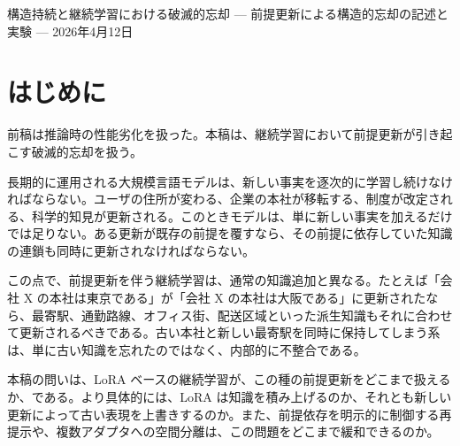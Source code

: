 \documentclass[12pt,a4paper]{article}
\begin{document}
\PaperTitleBlock
  {構造持続と継続学習における破滅的忘却}
  {— 前提更新による構造的忘却の記述と実験 —}
  {2026年4月12日}

\begin{abstract}
大規模言語モデルに新しい知識を逐次的に学習させると、古い知識が壊れることがある。しかし、すべての忘却が同じではない。ある前提が変わったとき、その前提に依存していた知識の連鎖がまとめて崩れる場合がある。本稿ではこれを構造的忘却と呼び、単一の事実の喪失と区別する。

7モデル（1.5B〜72B、4系統）で LoRA による逐次学習を行い、三つの条件を比較した。第一は過去の事実を再提示する基準条件（E-lite）、第二は前提の依存構造を追跡して選択的に再提示する条件（F-v2c）、第三は現在知識と過去知識を別々のアダプタに分離する条件（F-multi）である。全モデル・全条件で、最初の前提更新以降に旧知識の保持が急減した。LoRA は知識を積み上げるというより、上書きに近く振る舞う。前提依存を追跡して選択的に再提示すると依存整合性は改善するが、旧知識の保持忠実度は低いままである。多アダプタ分離は非ゼロの旧知識保持を与えるが、高忠実度の長期保持にはなお届かない。少なくとも本実験条件では、LoRA によるパラメータ更新だけでは依存知識の整合した再編を十分に担えないことが示される。
\end{abstract}

\section{はじめに}\label{ux306fux3058ux3081ux306b}

前稿は推論時の性能劣化を扱った。本稿は、継続学習において前提更新が引き起こす破滅的忘却を扱う。

長期的に運用される大規模言語モデルは、新しい事実を逐次的に学習し続けなければならない。ユーザの住所が変わる、企業の本社が移転する、制度が改定される、科学的知見が更新される。このときモデルは、単に新しい事実を加えるだけでは足りない。ある更新が既存の前提を覆すなら、その前提に依存していた知識の連鎖も同時に更新されなければならない。

この点で、前提更新を伴う継続学習は、通常の知識追加と異なる。たとえば「会社 X の本社は東京である」が「会社 X の本社は大阪である」に更新されたなら、最寄駅、通勤路線、オフィス街、配送区域といった派生知識もそれに合わせて更新されるべきである。古い本社と新しい最寄駅を同時に保持してしまう系は、単に古い知識を忘れたのではなく、内部的に不整合である。

本稿の問いは、LoRA ベースの継続学習が、この種の前提更新をどこまで扱えるか、である。より具体的には、LoRA は知識を積み上げるのか、それとも新しい更新によって古い表現を上書きするのか。また、前提依存を明示的に制御する再提示や、複数アダプタへの空間分離は、この問題をどこまで緩和できるのか。
\end{document}
